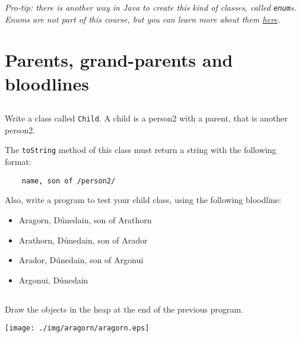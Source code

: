 \documentclass[a4paper, 11pt]{article}
\begin{document}
\textsl{Pro-tip: there is another way in Java to create this kind of classes,
called \texttt{enum}s. Enums are not part of this course, but you can learn
more about them
\href{http://docs.oracle.com/javase/tutorial/java/javaOO/enum.html}{here}.}

















\section{Parents, grand-parents and bloodlines}

\subsection{}

Write a class called \verb+Child+. A child is a person2 with a parent, that is
another person2.

The \verb+toString+ method of this class must return a string with the
following format:

\verb+    name, son of /person2/+

Also, write a program to test your child class, using the following bloodline:

\begin{itemize}

  \item Aragorn, Dúnedain, son of Arathorn

  \item Arathorn, Dúnedain, son of Arador

  \item Arador, Dúnedain, son of Argonui

  \item Argonui, Dúnedain

\end{itemize}













\subsection{}

Draw the objects in the heap at the end of the previous program.

\begin{solution}
  \texttt{[image: ./img/aragorn/aragorn.eps]}
\end{solution}
\end{document}
